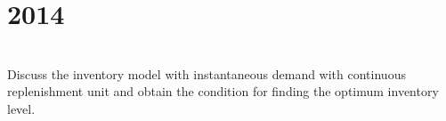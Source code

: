 \section*{2014}
\vspace{-.5cm}
\hrulefill \smallskip\\
 Discuss the inventory model with instantaneous demand with continuous replenishment unit and obtain the condition for finding the optimum inventory level.